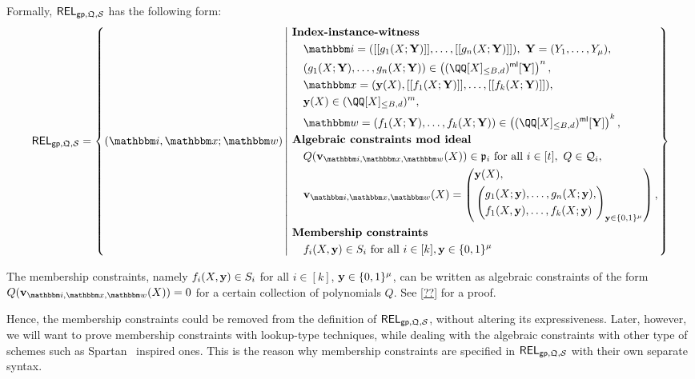 \documentclass[11pt,letterpaper,usenames,dvipsnames]{article}
\begin{document}
%
  Formally, $\mathsf{REL}_{\mathsf{gp},\mathfrak{Q}, \mathcal{S}}$ has the following form:
  \begin{equation*}
  \begin{aligned}
  \REL_{\gparams,\megaQ,\cS} = \left\{ (\idx, \inp ; \wit) \left| \ \begin{aligned}
  &\textbf{Index-instance-witness}\\
  &\quad \idx = ( \oracle{g_1(X;\YY)},\ldots, \oracle{g_n(X;\YY)}), \ \YY=(Y_1,\ldots, Y_\mu), \\
          &\quad(g_1(X;\YY),\dots,g_n(X;\YY))\in \left(\mainQpolyringmultilin[\YY]\right)^{n},\\
  &\quad \inp =(\yy(X), \oracle{f_1(X;\YY)}, \ldots, \oracle{f_k(X;\YY)}),\\ &\quad \yy(X)\in \mainQpolyring^{m},\\    
      &\quad \wit = (f_1(X;\YY), \ldots, f_k(X;\YY)) \in \left(\mainQpolyringmultilin[\YY]\right)^{k},\\
      &\textbf{Algebraic constraints mod ideal}\\
      &\quad Q(\vv_{\idx, \inp,\wit}(X)) \in \primeideal_i  \text{ for all } i\in [t], \ Q\in \cQ_i,\\
      &\quad \vv_{\idx, \inp,\wit}(X) = \left(\begin{aligned}&\yy(X),\\ &\left(\begin{aligned}&g_1(X;\yy),\ldots, g_n(X;\yy),\\ &f_1(X,\yy),\ldots, f_k(X;\yy)\end{aligned}\right)_{\yy\in \BB^\mu}\\
    \end{aligned}\right),\\
    &\textbf{Membership constraints}\\
      &\quad f_i(X,\yy)\in S_i \text{ for all } i\in [k], \yy\in \{0,1\}^\mu
  \end{aligned} \right.\right\}
  \end{aligned}
  \end{equation*}

  \begin{remark}
  The membership constraints, namely $f_i(X,\mathbf{y}) \in S_i$ for all $i\in [k]$, $\mathbf{y}\in \{0,1\}^\mu$, can be written as algebraic constraints of the form $Q(\vv_{\idx,\inp,\wit}(X))=0$ for a certain collection of polynomials $Q$. See \cref{??} for a proof. 
  
  Hence, the membership constraints could be removed from the definition of $\mathsf{REL}_{\mathsf{gp}, \mathfrak{Q}, \mathcal{S}}$,  without altering its expressiveness. Later, however, we will want to prove membership constraints with lookup-type techniques, while dealing with the algebraic constraints with other type of schemes such as Spartan~\cite{C:Setty20} inspired ones. This is the reason why membership constraints are specified in $\mathsf{REL}_{\mathsf{gp},\mathfrak{Q}, \mathcal{S}}$ with their own separate syntax.
  \end{remark}
\end{document}
